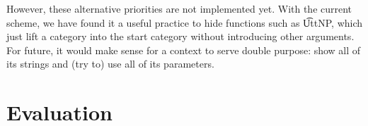 However, these alternative priorities are not implemented yet. With
the current scheme, we have found it a useful practice to hide
functions such as \t{UttNP}, which just lift a category into the start
category without introducing other arguments. For future, it would
make sense for a context to serve double purpose: show all of its
strings and (try to) use all of its parameters.




\section{Evaluation}
\label{sec:evalGF}

\begin{table}[h]
\centering
{}
\caption{Test cases for all functions in three grammars}
\label{results}
\end{table}


